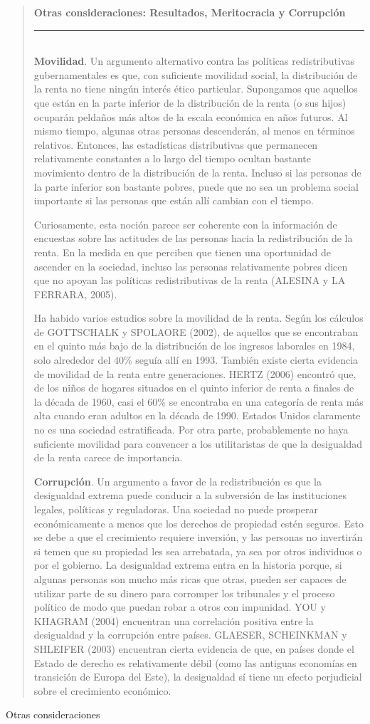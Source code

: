 \documentclass[10pt,a4paper]{article}
\newenvironment{specialblock}[1]{%
      \begin{quote} %
      \small %
      \noindent\textbf{#1}\\[-0.3em] %
      \rule{\linewidth}{0.4pt}\\[0.6em]}{
      \end{quote}}
\begin{document}
\begin{specialblock}{\textbf{Otras consideraciones:} Resultados, Meritocracia y Corrupción}
    \textbf{Movilidad}. Un argumento alternativo contra las políticas redistributivas gubernamentales es que, con suficiente movilidad social, la distribución de la renta no tiene ningún interés ético particular. Supongamos que aquellos que están en la parte inferior de la distribución de la renta (o sus hijos) ocuparán peldaños más altos de la escala económica en años futuros. Al mismo tiempo, algunas otras personas descenderán, al menos en términos relativos. Entonces, las estadísticas distributivas que permanecen relativamente constantes a lo largo del tiempo ocultan bastante movimiento dentro de la distribución de la renta. Incluso si las personas de la parte inferior son bastante pobres, puede que no sea un problema social importante si las personas que están allí cambian con el tiempo.

    Curiosamente, esta noción parece ser coherente con la información de encuestas sobre las actitudes de las personas hacia la redistribución de la renta. En la medida en que perciben que tienen una oportunidad de ascender en la sociedad, incluso las personas relativamente pobres dicen que no apoyan las políticas redistributivas de la renta (ALESINA y LA FERRARA, 2005).
    
    Ha habido varios estudios sobre la movilidad de la renta. Según los cálculos de GOTTSCHALK y SPOLAORE (2002), de aquellos que se encontraban en el quinto más bajo de la distribución de los ingresos laborales en 1984, solo alrededor del $40\%$ seguía allí en 1993. También existe cierta evidencia de movilidad de la renta entre generaciones. HERTZ (2006) encontró que, de los niños de hogares situados en el quinto inferior de renta a finales de la década de 1960, casi el $60\%$ se encontraba en una categoría de renta más alta cuando eran adultos en la década de 1990. Estados Unidos claramente no es una sociedad estratificada. Por otra parte, probablemente no haya suficiente movilidad para convencer a los utilitaristas de que la desigualdad de la renta carece de importancia.

    \textbf{Corrupción}. Un argumento a favor de la redistribución es que la desigualdad extrema puede conducir a la subversión de las instituciones legales, políticas y reguladoras. Una sociedad no puede prosperar económicamente a menos que los derechos de propiedad estén seguros. Esto se debe a que el crecimiento requiere inversión, y las personas no invertirán si temen que su propiedad les sea arrebatada, ya sea por otros individuos o por el gobierno. La desigualdad extrema entra en la historia porque, si algunas personas son mucho más ricas que otras, pueden ser capaces de utilizar parte de su dinero para corromper los tribunales y el proceso político de modo que puedan robar a otros con impunidad. YOU y KHAGRAM (2004) encuentran una correlación positiva entre la desigualdad y la corrupción entre países. GLAESER, SCHEINKMAN y SHLEIFER (2003) encuentran cierta evidencia de que, en países donde el Estado de derecho es relativamente débil (como las antiguas economías en transición de Europa del Este), la desigualdad sí tiene un efecto perjudicial sobre el crecimiento económico.
\end{specialblock}Otras consideraciones
\end{document}
